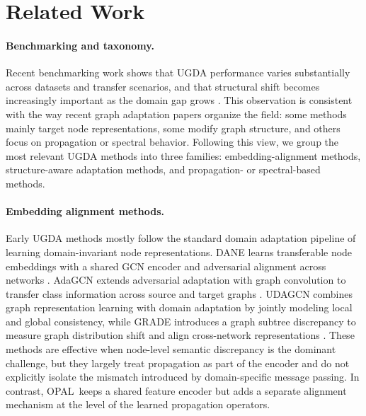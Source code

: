 \documentclass[runningheads]{llncs}
\newcommand{\model}{OPAL}
\begin{document}
\section{Related Work}

\paragraph{Benchmarking and taxonomy.}
Recent benchmarking work shows that UGDA performance varies substantially across datasets and transfer scenarios, and that structural shift becomes increasingly important as the domain gap grows \cite{pygda}. This observation is consistent with the way recent graph adaptation papers organize the field: some methods mainly target node representations, some modify graph structure, and others focus on propagation or spectral behavior. Following this view, we group the most relevant UGDA methods into three families: embedding-alignment methods, structure-aware adaptation methods, and propagation- or spectral-based methods.

\paragraph{Embedding alignment methods.}
Early UGDA methods mostly follow the standard domain adaptation pipeline of learning domain-invariant node representations. DANE learns transferable node embeddings with a shared GCN encoder and adversarial alignment across networks \cite{dane}. AdaGCN extends adversarial adaptation with graph convolution to transfer class information across source and target graphs \cite{adagcn}. UDAGCN combines graph representation learning with domain adaptation by jointly modeling local and global consistency, while GRADE introduces a graph subtree discrepancy to measure graph distribution shift and align cross-network representations \cite{udagcn,grade}. These methods are effective when node-level semantic discrepancy is the dominant challenge, but they largely treat propagation as part of the encoder and do not explicitly isolate the mismatch introduced by domain-specific message passing. In contrast, \model\ keeps a shared feature encoder but adds a separate alignment mechanism at the level of the learned propagation operators.
\end{document}
